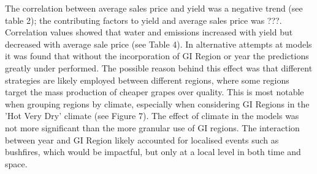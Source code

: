\documentclass[review,12pt,authoryear]{elsarticle}
\begin{document}
\begin{linenumbers}






The correlation between average sales price and yield was a negative trend (see table 2); the contributing factors to yield and average sales price was ???. Correlation values showed that water and emissions increased with yield but decreased with average sale price (see Table 4). In alternative attempts at models it was found that without the incorporation of GI Region or year the predictions greatly under performed. The possible reason behind this effect was that different strategies are likely employed between different regions, where some regions target the mass production of cheaper grapes over quality. %
 This is most notable when grouping regions by climate, especially when considering GI Regions in the 'Hot Very Dry' climate (see Figure 7). The effect of climate in the models was not more significant than the more granular use of GI regions. The interaction between year and GI Region likely accounted for localised events such as bushfires, which would be impactful, but only at a local level in both time and space.




\end{linenumbers}
\end{document}
